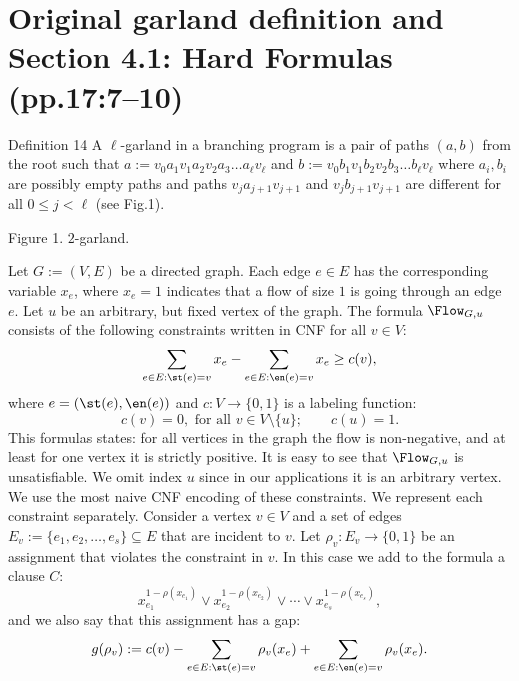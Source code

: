 \section*{Original garland definition and Section 4.1: Hard Formulas (pp.17:7--10)}
\begin{result}{Definition 14}
A $\ell$-garland in a branching program is a pair of paths $(a,b)$ from the root such that $a:=v_0a_1v_1a_2v_2a_3\ldots a_\ell v_\ell$ and $b:=v_0b_1v_1b_2v_2b_3\ldots b_\ell v_\ell$ where $a_i,b_i$ are possibly empty paths and paths $v_ja_{j+1}v_{j+1}$ and $v_jb_{j+1}v_{j+1}$ are different for all $0\le j<\ell$ (see Fig.1).
\end{result}
\begin{center}\par Figure 1. $2$-garland.\end{center}
Let $G:=(V,E)$ be a directed graph. Each edge $e\in E$ has the corresponding variable $x_e$, where $x_e=1$ indicates that a flow of size $1$ is going through an edge $e$. Let $u$ be an arbitrary, but fixed vertex of the graph.
The formula $\Flow_{G,u}$ consists of the following constraints written in CNF for all $v\in V$:
\[\sum_{e\in E:\st(e)=v}x_e-\sum_{e\in E:\en(e)=v}x_e\ge c(v),\]
where $e=(\st(e),\en(e))$ and $c:V\to\{0,1\}$ is a labeling function:
\[c(v)=0,\text{ for all }v\in V\setminus\{u\};\qquad c(u)=1.\]
This formulas states: for all vertices in the graph the flow is non-negative, and at least for one vertex it is strictly positive. It is easy to see that $\Flow_{G,u}$ is unsatisfiable. We omit index $u$ since in our applications it is an arbitrary vertex.
We use the most naive CNF encoding of these constraints. We represent each constraint separately. Consider a vertex $v\in V$ and a set of edges $E_v:=\{e_1,e_2,\ldots,e_s\}\subseteq E$ that are incident to $v$. Let $\rho_v:E_v\to\{0,1\}$ be an assignment that violates the constraint in $v$. In this case we add to the formula a clause $C$:
\[x_{e_1}^{1-\rho(x_{e_1})}\vee x_{e_2}^{1-\rho(x_{e_2})}\vee\cdots\vee x_{e_s}^{1-\rho(x_{e_s})},\]
and we also say that this assignment has a gap:
\[g(\rho_v):=c(v)-\sum_{e\in E:\st(e)=v}\rho_v(x_e)+\sum_{e\in E:\en(e)=v}\rho_v(x_e).\]
